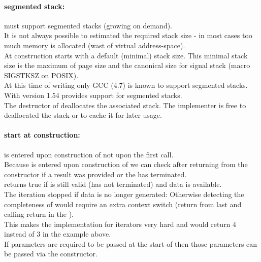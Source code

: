 \paragraph*{segmented stack:}
\coro must support segmented stacks (growing on demand).\\
\newline
It is not always possible to estimated the required stack size - in most cases
too much memory is allocated (wast of virtual address-space).\\
\newline
At construction \coro starts with a default (minimal) stack size. This minimal
stack size is the maximum of page size and the canonical size for signal stack
(macro SIGSTKSZ on POSIX).\\
\newline
At this time of writing only GCC (4.7)\cite{gccsplit} is known to support segmented
stacks. With version 1.54 \boostcoroutine provides support for segmented stacks.\\
\newline
The destructor of \coro deallocates the associated stack. The implementer is
free to deallocated the stack or to cache it for later usage.

\paragraph*{start at construction:}
\corofunction is entered upon construction of \coro not upon the first call.\\
\newline
Because \corofunction is entered upon construction of \coro we can check after
returning from the constructor if a result was provided or the \corofunction
has terminated.\\
\corobool returns true if \coro is still valid (\corofunction has not terminated)
and data is available.\\
The iteration stopped if data is no longer generated:
Otherwise detecting the completeness of \coro would require an extra context
switch (return from last \coroop and calling return in the \corofunction).\\
This makes the implementation for iterators very hard and 
would return 4 instead of 3 in the example above.\\
\newline
If parameters are required to be passed at the start of \corofunction then those
parameters can be passed via the \coro constructor.

